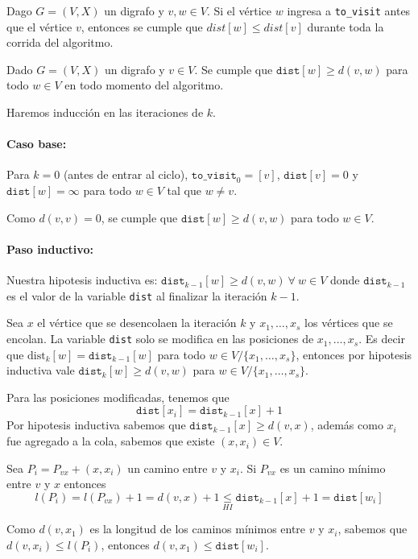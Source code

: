 \begin{coro}
  Dago \(G=(V,X)\) un digrafo y \(v,w\in V\). Si el vértice \(w\) ingresa a \texttt{to\_visit} antes que el vértice \(v\), entonces se cumple que \(dist[w]\leq dist[v]\) durante toda la corrida del algoritmo.
\end{coro}

\begin{lema}\label{lema::BFS::distMayorAd}
  Dado \(G=(V, X)\) un digrafo y \(v\in V\). Se cumple que \(\texttt{dist}[w]\geq d(v,w)\) para todo \(w\in V\) en todo momento del algoritmo.
\end{lema}

\begin{demo}
  Haremos inducción en las iteraciones de \(k\).

  \paragraph{Caso base:} Para \(k=0\) (antes de entrar al ciclo), \(\texttt{to\_visit}_0 = [v]\), \(\texttt{dist}[v] = 0\) y \(\texttt{dist}[w] = \infty\) para todo \(w\in V\) tal que \(w\neq v\).

  Como \(d(v,v) = 0\), se cumple que \(\texttt{dist}[w] \geq d(v,w)\) para todo \(w\in V\).

  \paragraph{Paso inductivo:} Nuestra hipotesis inductiva es: \(\texttt{dist}_{k-1}[w] \geq d(v,w)~\forall~w\in V\) donde \(\texttt{dist}_{k-1}\) es el valor de la variable \texttt{dist} al finalizar la iteración \(k-1\).

  Sea \(x\) el vértice que se desencolaen la iteración \(k\) y \(x_1,\dots,x_s\) los vértices que se encolan. La variable \texttt{dist} solo se modifica en las posiciones de \(x_1,\dots,x_s\). Es decir que \(\text{dist}_k[w] = \texttt{dist}_{k-1}[w]\) para todo \(w\in V / \{x_1,\dots,x_s\}\), entonces por hipotesis inductiva vale \(\texttt{dist}_k[w] \geq d(v,w)\) para \(w\in V / \{x_1,\dots,x_s\}\).

  Para las posiciones modificadas, tenemos que \[\texttt{dist}[x_i] = \texttt{dist}_{k-1}[x] + 1\]Por hipotesis inductiva sabemos que \(\texttt{dist}_{k-1}[x] \geq d(v,x)\), además como \(x_i\) fue agregado a la cola, sabemos que existe \((x, x_i)\in V\).

  Sea \(P_{i} = P_{vx} + (x,x_i)\) un camino entre \(v\) y \(x_i\). Si \(P_{vx}\) es un camino mínimo entre \(v\) y \(x\) entonces \[l(P_{i}) = l(P_{vx}) + 1 = d(v,x) + 1 \underset{HI}{\leq} \texttt{dist}_{k-1}[x] + 1 = \texttt{dist}[w_i] \]
\end{demo}
\begin{demoPart}
  Como \(d(v,x_1)\) es la longitud de los caminos mínimos entre \(v\) y \(x_i\), sabemos que \(d(v, x_i) \leq l(P_i)\), entonces \(d(v,x_1) \leq \texttt{dist}[w_i]\).
\end{demoPart}

